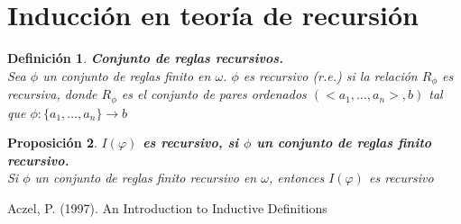 \documentclass[executivepaper]{article}
\newtheorem{propo}{Proposición}[section]
\newtheorem{defi}[propo]{Definición}
\begin{document}
\newpage
\section{Inducción en teoría de recursión}
\begin{defi} \textbf{Conjunto de reglas recursivos.}\\
    Sea $\phi$ un conjunto de reglas finito en $\omega$. $\phi$ es recursivo (r.e.) si la relación $R_{\phi}$ es recursiva, donde  $R_{\phi}$ es el conjunto de pares ordenados $(<a_1,\ldots, a_n>,b)$ tal que $\phi: \{a_1,\ldots, a_n\}\rightarrow b$
\end{defi}

\begin{propo} \textbf{$I(\varphi)$ es recursivo, si $\phi$ un conjunto de reglas finito recursivo.}\\
    Si $\phi$ un conjunto de reglas finito recursivo en $\omega$, entonces $I(\varphi)$ es recursivo
\end{propo}

\newpage
\begin{thebibliography}{9}
    Aczel, P. (1997). 
    An Introduction to Inductive Definitions
\end{thebibliography}
\end{document}
